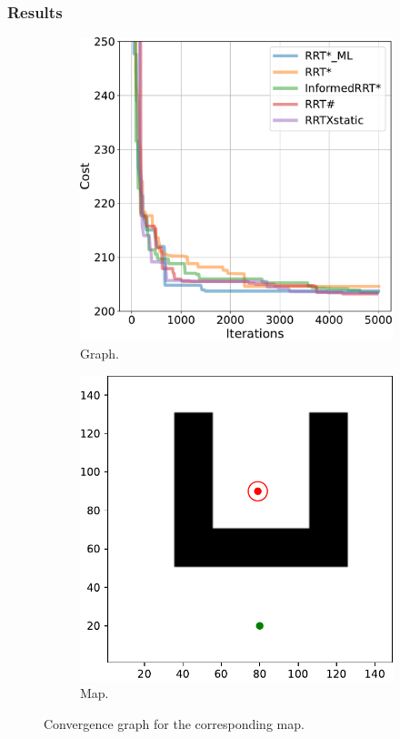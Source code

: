 \documentclass{beamer}
\begin{document}
\begin{frame}
	\frametitle{Results}	
	\begin{figure}[!ht]
		\centering 
		\begin{subfigure}[b]{0.48\textwidth}
		  \includegraphics[width=\textwidth]{figChap5/graph_U_20pt_ticks.pdf}  
		  \caption{Graph.}
		  \label{fig:maze_U_graphs}
		\end{subfigure}
		\begin{subfigure}[b]{0.49\textwidth}
			\includegraphics[width=\textwidth]{figChap5/Maze_U_ticks.pdf}
			\caption{Map.}
			\label{fig:maze_U_Cspace} 
		\end{subfigure}  
		\caption{Convergence graph for the corresponding map.}
		\label{fig:maze_U}
	  \end{figure}
\end{frame}	
\end{document}
